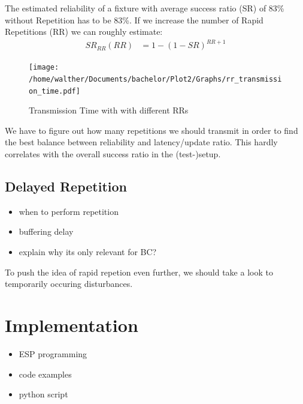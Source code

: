\documentclass[]{ccs-thesis}
\begin{document}
The estimated reliability of a fixture with average success ratio (SR) of 83\% without Repetition has to be 83\%.
If we increase the number of Rapid Repetitions (RR) we can roughly estimate:
\begin{align}
	SR_{RR}(RR) &= 1-(1-SR)^{RR+1} 
\end{align}

\begin{figure}
	\centering
	\texttt{[image: /home/walther/Documents/bachelor/Plot2/Graphs/rr\_transmission\_time.pdf]}
	\caption{Transmission Time with with different \ac{RR}s}
	\label{fig:bc_analytic}
\end{figure}

We have to figure out how many repetitions we should transmit in order to find the best balance between reliability and latency/update ratio.
This hardly correlates with the overall success ratio in the (test-)setup. 

\subsection{Delayed Repetition}
\label{sub:DelayedRepetition}
\begin{itemize}
\item when to perform repetition
\item buffering delay
\item explain why its only relevant for BC?
\end{itemize}

To push the idea of rapid repetion even further, we should take a look to temporarily occuring disturbances.

\section{Implementation}
\begin{itemize}
\item ESP programming
\item code examples
\item python script
\end{itemize}

\end{document}
